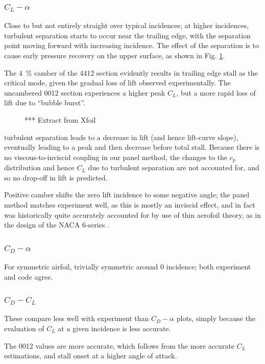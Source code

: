 \documentclass[12pt]{article}
\begin{document}
\subsubsection{$C_L - \alpha$}
Close to but not entirely straight over typical incidences; at higher incidences, turbulent separation starts to occur near the trailing edge, with the separation point moving forward with increasing incidence. The effect of the separation is to cause early pressure recovery on the upper surface, as shown in Fig. \ref{fig:separation_cp}.

The \qty{4}{\percent} camber of the 4412 section evidently results in trailing edge stall as the critical mode, given the gradual loss of lift observed experimentally. The uncambered 0012 section experiences a higher peak $C_L$, but a more rapid loss of lift due to ``bubble burst''. 

\begin{figure}[H]
    \centering
    \caption{*** Extract from Xfoil}
    \label{fig:separation_cp}
\end{figure}
turbulent separation leads to a decrease in lift (and hence lift-curve slope), eventually leading to a peak and then decrease before total stall. Because there is no viscous-to-inviscid coupling in our panel method, the changes to the $c_p$ distribution and hence $C_L$ due to turbulent separation are not accounted for, and so no drop-off in lift is predicted.

Positive camber shifts the zero lift incidence to some negative angle; the panel method matches experiment well, as this is mostly an inviscid effect, and in fact was historically quite accurately accounted for by use of thin aerofoil theory, as in the design of the NACA 6-series \cite{naca6seriessummary}.
\subsubsection{$C_D - \alpha$}
For symmetric airfoil, trivially symmetric around 0 incidence; both experiment and code agree.

\subsubsection{$C_D - C_L$}
These compare less well with experiment than $C_D - \alpha$ plots, simply because the evaluation of $C_L$ at a given incidence is less accurate.

The 0012 values are more accurate, which follows from the more accurate $C_L$ estimations, and stall onset at a higher angle of attack.
\end{document}
